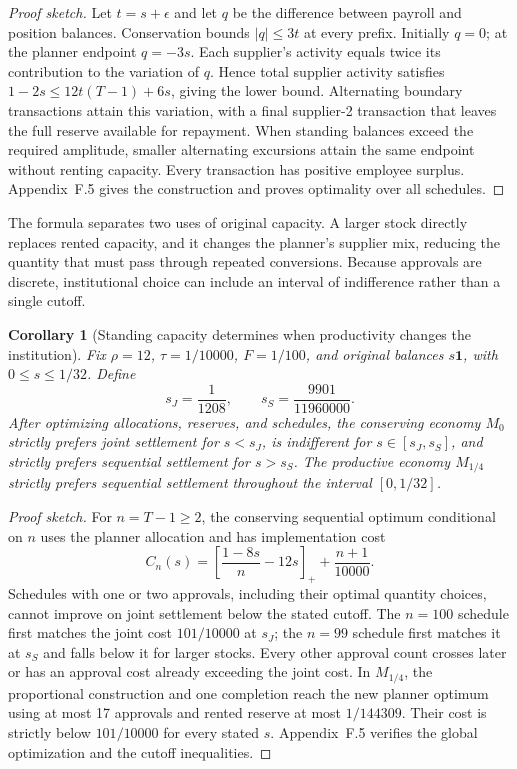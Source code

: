\documentclass[ecta,draft]{econsocart}
\newtheorem{corollary}[theorem]{Corollary}
\theoremstyle{definition}
\theoremstyle{definition}
\begin{document}
\begin{proof}[Proof sketch]
Let $t=s+\epsilon$ and let $q$ be the difference between payroll
and position balances. Conservation bounds $|q|\leq3t$ at every
prefix. Initially $q=0$; at the planner endpoint $q=-3s$.
Each supplier's activity equals twice its contribution to the
variation of $q$. Hence total supplier activity satisfies
$1-2s\leq12t(T-1)+6s$, giving the lower bound.
Alternating boundary transactions attain this variation, with a
final supplier-2 transaction that leaves the full reserve available
for repayment. When standing balances exceed the required amplitude,
smaller alternating excursions attain the same endpoint without
renting capacity. Every transaction has positive employee surplus.
Appendix~F.5%
 gives the construction and proves
optimality over all schedules.
\end{proof}

The formula separates two uses of original capacity. A larger stock
directly replaces rented capacity, and it changes the planner's
supplier mix, reducing the quantity that must pass through repeated
conversions. Because approvals are discrete, institutional choice
can include an interval of indifference rather than a single cutoff.

\begin{corollary}[Standing capacity determines when productivity changes the institution]
\label{cor:standingcutoffs}
Fix $\rho=12$, $\tau=1/10000$, $F=1/100$, and original balances
$s\mathbf1$, with $0\leq s\leq1/32$. Define
\[
 s_J=\frac1{1208},\qquad
 s_S=\frac{9901}{11960000}.
\]
After optimizing allocations, reserves, and schedules, the
conserving economy $M_0$ strictly prefers joint settlement for
$s<s_J$, is indifferent for $s\in[s_J,s_S]$, and strictly prefers
sequential settlement for $s>s_S$. The productive economy
$M_{1/4}$ strictly prefers sequential settlement throughout the
interval $[0,1/32]$.
\end{corollary}

\begin{proof}[Proof sketch]
For $n=T-1\geq2$, the conserving sequential optimum conditional
on $n$ uses the planner allocation and has implementation cost
\[
 C_n(s)=\left[\frac{1-8s}{n}-12s\right]_+
          +\frac{n+1}{10000}.
\]
Schedules with one or two approvals, including their optimal
quantity choices, cannot improve on joint settlement below the
stated cutoff. The $n=100$ schedule first matches the joint cost
$101/10000$ at $s_J$; the $n=99$ schedule first matches it
at $s_S$ and falls below it for larger stocks. Every other approval count crosses later or has an
approval cost already exceeding the joint cost. In $M_{1/4}$,
the proportional construction and one completion reach the new
planner optimum using at most 17 approvals and rented reserve
at most $1/144309$. Their cost is strictly below $101/10000$
for every stated $s$. Appendix~F.5%
 verifies
the global optimization and the cutoff inequalities.
\end{proof}
\end{document}

